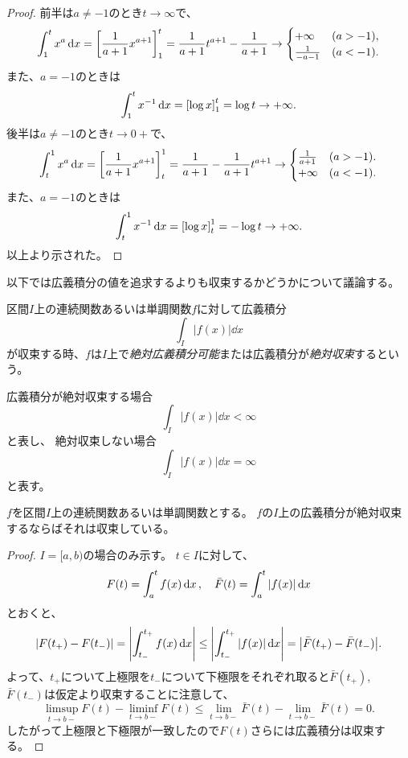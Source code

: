 \begin{proof}
前半は$a \ne -1$のとき$t \to \infty$で、
$$
\int_1^t x^a\dd{x} = \lreval*{\frac{1}{a+1}x^{a+1}}_1^t = \frac{1}{a+1}t^{a+1}-\frac{1}{a+1} \to
\begin{cases}
+\infty & (a > -1), \\
\frac{1}{-a-1} & (a < -1).
\end{cases}
$$
また、$a = -1$のときは
$$
\int_1^t x^{-1}\dd{x} = \lreval*{\log x}_1^t = \log t \to +\infty.
$$
後半は$a \ne -1$のとき$t \to 0+$で、
$$
\int_t^1 x^a\dd{x} = \lreval*{\frac{1}{a+1}x^{a+1}}_t^1 = \frac{1}{a+1}-\frac{1}{a+1}t^{a+1} \to
\begin{cases}
\frac{1}{a+1} & (a > -1). \\
+\infty & (a < -1).
\end{cases}
$$
また、$a = -1$のときは
$$
\int_t^1 x^{-1}\dd{x} = \lreval*{\log x}_t^1 = -\log t \to +\infty.
$$
以上より示された。
\end{proof}

以下では広義積分の値を追求するよりも収束するかどうかについて議論する。

\begin{definition}[広義積分の絶対収束]
区間$I$上の連続関数あるいは単調関数$f$に対して広義積分
$$
\int_I |f(x)|\dd{x}
$$
が収束する時、$f$は$I$上で\emph{絶対広義積分可能}または広義積分が\emph{絶対収束}するという。
\end{definition}

\begin{remark}
広義積分が絶対収束する場合
$$
\int_I |f(x)|\dd{x} < \infty
$$
と表し、
絶対収束しない場合
$$
\int_I |f(x)|\dd{x} = \infty
$$
と表す。
\end{remark}

\begin{proposition}
$f$を区間$I$上の連続関数あるいは単調関数とする。
$f$の$I$上の広義積分が絶対収束するならばそれは収束している。
\end{proposition}

\begin{proof}
$I = [a, b)$の場合のみ示す。
$t \in I$に対して、
$$
F(t) = \int_a^t f(x)\dd{x},
\quad \bar{F}(t) = \int_a^t \abs{f(x)}\dd{x}
$$
とおくと、
$$
\abs{F(t_+)-F(t_-)} = \abs{\int_{t_-}^{t_+} f(x)\dd{x}} \le \abs{\int_{t_-}^{t_+} \abs{f(x)}\dd{x}} = \abs{\bar{F}(t_+)-\bar{F}(t_-)}.
$$
よって、$t_+$について上極限を$t_-$について下極限をそれぞれ取ると$\bar{F}(t_+)$, $\bar{F}(t_-)$は仮定より収束することに注意して、
$$
\limsup_{t \to b-}F(t)-\liminf_{t \to b-}F(t) \le \lim_{t \to b-}\bar{F}(t)-\lim_{t \to b-}\bar{F}(t) = 0.
$$
したがって上極限と下極限が一致したので$F(t)$さらには広義積分は収束する。
\end{proof}

